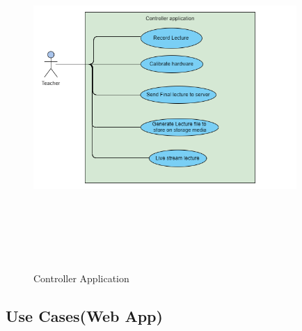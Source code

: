 \documentclass[12pt]{article}
\begin{document}
\newpage
\mbox\\
\begin{figure}[h]
\begin{center}
\includegraphics[width=10cm, height=13cm]{ControllerApplication}
\caption{Controller Application}
\end{center}
\end{figure}

\newpage
\subsection{Use Cases(Web App)}
\end{document}
